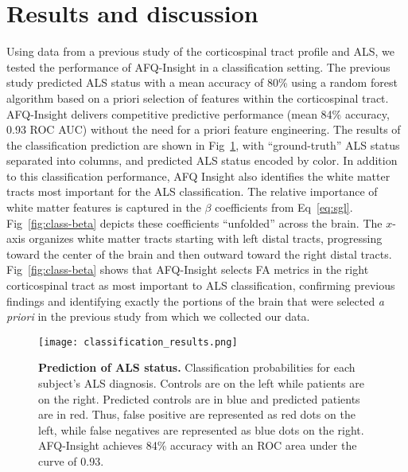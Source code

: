 \section*{Results and discussion}

Using data from a previous study of the corticospinal tract profile and ALS\cite{sarica2017corticospinal}, we tested the performance of AFQ-Insight in a classification setting. The previous study predicted ALS status with a mean accuracy of 80\% using a random forest algorithm based on a priori selection of features within the corticospinal tract. AFQ-Insight delivers competitive predictive performance (mean 84\% accuracy, 0.93 ROC AUC) without the need for a priori feature engineering. The results of the classification prediction are shown in Fig~\ref{fig:class-results}, with ``ground-truth'' ALS status separated into columns, and predicted ALS status encoded by color. In addition to this classification performance, AFQ Insight also identifies the white matter tracts most important for the ALS classification. The relative importance of white matter features is captured in the $\beta$ coefficients from Eq~\eqref{eq:sgl}. Fig~\ref{fig:class-beta} depicts these coefficients ``unfolded'' across the brain. The $x$-axis organizes white matter tracts starting with left distal tracts, progressing toward the center of the brain and then outward toward the right distal tracts. Fig~\ref{fig:class-beta} shows that AFQ-Insight selects FA metrics in the right corticospinal tract as most important to ALS classification, confirming previous findings\cite{van2011upper, toosy2003diffusion, sarica2014tractography, sage2007quantitative, sage2009quantitative, karlsborg2004corticospinal, ellis1999diffusion, cosottini2005diffusion, ciccarelli2009investigation, abe2010voxel} and identifying exactly the portions of the brain that were selected \emph{a priori} in the previous study from which we collected our data\cite{sarica2017corticospinal}.

\begin{figure}[!h]
    \centering
    \texttt{[image: classification\_results.png]}
    \caption{{\bf Prediction of ALS status.}
        Classification probabilities for each subject's ALS diagnosis. Controls are on the left while patients are on the right. Predicted controls are in blue and predicted patients are in red. Thus, false positive are represented as red dots on the left, while false negatives are represented as blue dots on the right. AFQ-Insight achieves 84\% accuracy with an ROC area under the curve of 0.93.
    }
    \label{fig:class-results}
\end{figure}

